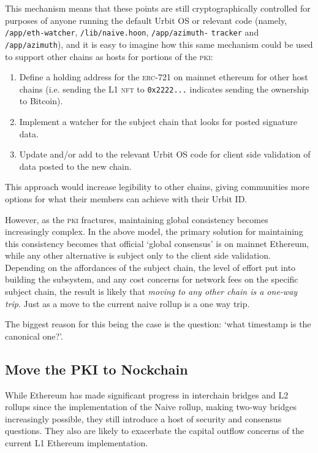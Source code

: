 \documentclass[twoside]{article}
\begin{document}
\sloppy
This mechanism means that these points are still cryptographically controlled for purposes of anyone running the \mbox{default} Urbit OS or relevant code (namely, \lstinline[style=inlinecode]{/app/eth-watcher}, \lstinline[style=inlinecode]{/lib/naive.hoon}, \lstinline[style=inlinecode]{/app/azimuth-} \lstinline[style=inlinecode]{tracker} and \lstinline[style=inlinecode]{/app/azimuth}), and it is easy to imagine how this same mechanism could be used to support other chains as hosts for portions of the \textsc{pki}:

\begin{enumerate}
  \item  Define a holding address for the \textsc{erc}-721 on mainnet ethereum for other host chains (i.e. sending the L1 \textsc{nft} to \lstinline[style=inlinecode]{0x2222...} indicates sending the ownership to Bitcoin).
  \item  Implement a watcher for the subject chain that looks for posted signature data.
  \item  Update and/or add to the relevant Urbit OS code for client side validation of data posted to the new chain.
\end{enumerate}

\noindent
This approach would increase legibility to other chains, giving communities more options for what their members can achieve with their Urbit ID.

However, as the \textsc{pki} fractures, maintaining global consistency becomes increasingly complex. In the above model, the primary solution for maintaining this consistency becomes that official `global consensus' is on mainnet Ethereum, while any other alternative is subject only to the client side validation. Depending on the affordances of the subject chain, the level of effort put into building the subsystem, and any cost concerns for network fees on the specific subject chain, the result is likely that \emph{moving to any other chain is a one-way trip}. Just as a move to the current naive rollup is a one way trip.

The biggest reason for this being the case is the question: `what timestamp is the canonical one?'.

\subsection[Move the \textsc{pki} to Nockchain]{Move the PKI to Nockchain}

While Ethereum has made significant progress in interchain bridges and L2 rollups since the implementation of the Naive rollup, making two-way bridges increasingly possible, they still introduce a host of security and consensus questions. They also are likely to exacerbate the capital outflow concerns of the current L1 Ethereum implementation.
\end{document}
